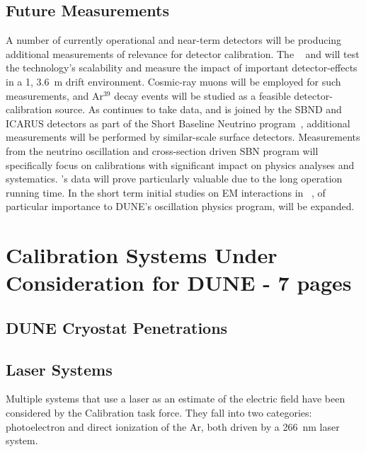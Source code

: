 \subsection{Future Measurements}
A number of currently operational and near-term  detectors will be producing additional measurements of relevance for detector calibration. The ~\cite{bib:protoDUNE} and  %
will test the technology's scalability and measure the impact of important detector-effects in a \SI{1}{\kt}, \SI{3.6}{\m} drift environment. Cosmic-ray muons will be employed for such measurements, and Ar${}^{39}$ decay events will be studied as a feasible detector-calibration source. As  continues to take data, and is joined by the SBND and ICARUS detectors as part of the Short Baseline Neutrino program~\cite{bib:SBN}, additional measurements will be performed by similar-scale surface detectors. Measurements from the neutrino oscillation and cross-section driven SBN program will specifically focus on calibrations with significant impact on physics analyses and systematics. 's data will prove particularly valuable due to the long operation running time. In the short term initial studies on EM interactions in ~\cite{bib:caratelli}, of particular importance to DUNE's oscillation physics program, will be expanded.

\section{Calibration Systems Under Consideration for DUNE - 7  pages}\label{sec:extsystems}

\subsection{DUNE Cryostat Penetrations}
\label{sec:FTs}


\subsection{Laser Systems}\label{sec:laser}

Multiple systems that use a laser as an estimate of the electric field have been considered by the Calibration task force.  They fall into two categories:  photoelectron and direct ionization of the Ar, both driven by a \SI{266}{\nano\m} laser system.

